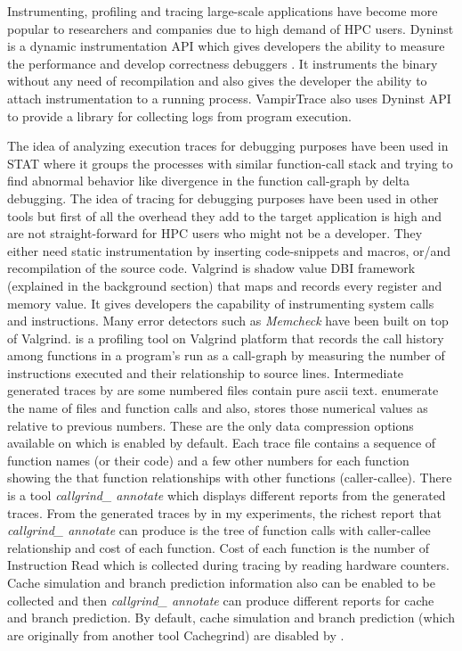 Instrumenting, profiling and tracing large-scale applications have become more popular to researchers and companies \cite{ddt} due to high demand of HPC users. 
Dyninst\cite{dyninst} is a dynamic instrumentation API which gives developers the ability to measure the performance \cite{openss}\cite{tau} and develop correctness debuggers \cite{stat}. It instruments the binary without any need of recompilation and also gives the developer the ability to attach instrumentation to a running process. VampirTrace\cite{vampirt} also uses Dyninst API to provide a library for collecting logs from program execution. 

The idea of analyzing execution traces for debugging purposes have been used in STAT\cite{stat} where it groups the processes with similar function-call stack and trying to find abnormal behavior like divergence in the function call-graph by delta debugging. The idea of tracing for debugging purposes have been used in other tools but first of all the overhead they add to the target application is high and are not straight-forward for HPC users who might not be a developer. They either need static instrumentation by inserting code-snippets and macros, or/and recompilation of the source code. 
Valgrind\cite{valgrind} is shadow value DBI framework (explained in the background section) that maps and records every register and memory value. It gives developers the capability of instrumenting system calls and instructions. Many error detectors such as \textit{Memcheck} have been built on top of Valgrind. \callgrind \cite{callgrind} is a profiling tool  on Valgrind platform that records the call history among functions in a program's run as a call-graph by measuring the number of instructions executed and their relationship to source lines. 
Intermediate generated traces by \callgrind are some numbered files contain pure ascii text. \callgrind enumerate the name of files and function calls and also, stores those numerical values as relative to previous numbers. These are the only data compression options available on \callgrind which is enabled by default. Each \callgrind trace file contains a sequence of function names (or their code) and a few other numbers for each function showing the that function relationships with other functions (caller-callee). There is a tool \textit{callgrind\_ annotate} which displays different reports from the generated traces. From the generated traces by \callgrind in my experiments, the richest report that \textit{callgrind\_ annotate} can produce is the tree of function calls with caller-callee relationship and cost of each function. Cost of each function is the number of Instruction Read which is collected during tracing by reading hardware counters. Cache simulation and branch prediction information also can be enabled to be collected and then \textit{callgrind\_ annotate} can produce different reports for cache and branch prediction. By default, cache simulation and branch prediction (which are originally from another tool Cachegrind) are disabled by \callgrind.

